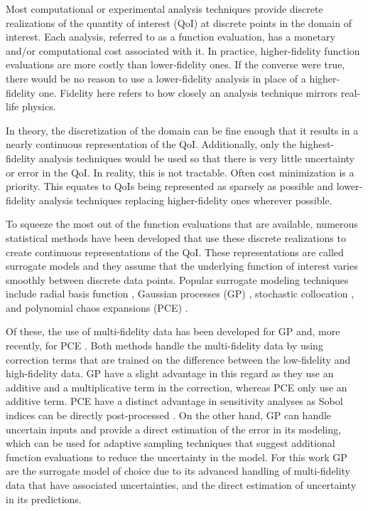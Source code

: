Most computational or experimental analysis techniques provide discrete realizations of the quantity of interest (QoI) at discrete points in the domain of interest. 
Each analysis, referred to as a function evaluation, has a monetary and/or computational cost associated with it. 
In practice, higher-fidelity function evaluations are more costly than lower-fidelity ones.
If the converse were true, there would be no reason to use a lower-fidelity analysis in place of a higher-fidelity one.
Fidelity here refers to how closely an analysis technique mirrors real-life physics. 

In theory, the discretization of the domain can be fine enough that it results in a nearly continuous representation of the QoI.
Additionally, only the highest-fidelity analysis techniques would be used so that there is very little uncertainty or error in the QoI. 
In reality, this is not tractable. 
Often cost minimization is a priority. 
This equates to QoIs being represented as sparsely as possible and lower-fidelity analysis techniques replacing higher-fidelity ones wherever possible.  

To squeeze the most out of the function evaluations that are available, numerous statistical methods have been developed that use these discrete realizations to create continuous representations of the QoI.
These representations are called surrogate models and they assume that the underlying function of interest varies smoothly between discrete data points.
Popular surrogate modeling techniques include radial basis function \cite{park1991universal}, Gaussian processes (GP) \cite{krige1951statistical,matheron1963principles,rasmussen_gaussian_2006}, stochastic collocation \cite{loeven2007probabilistic}, and polynomial chaos expansions (PCE) \cite{oladyshkin2012data,blatman2011adaptive}.

Of these, the use of multi-fidelity data has been developed for GP \cite{kennedy_predicting_2000,gratiet_multi-fidelity_nodate} and, more recently, for PCE \cite{ng2012multifidelity, palar2018global}.
Both methods handle the multi-fidelity data by using correction terms that are trained on the difference between the low-fidelity and high-fidelity data. 
GP have a slight advantage in this regard as they use an additive and a multiplicative term in the correction, whereas PCE only use an additive term. 
PCE have a distinct advantage in sensitivity analyses as Sobol indices can be directly post-processed \cite{sudret2008global,crestaux2009polynomial}.
On the other hand, GP can handle uncertain inputs and provide a direct estimation of the error in its modeling, which can be used for adaptive sampling techniques that suggest additional function evaluations to reduce the uncertainty in the model.
For this work GP are the surrogate model of choice due to its advanced handling of multi-fidelity data that have associated uncertainties, and the direct estimation of uncertainty in its predictions. 

